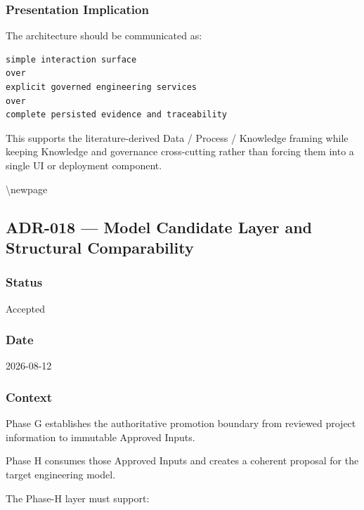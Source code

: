 \hypertarget{presentation-implication}{%
\subsubsection{Presentation Implication}\label{presentation-implication}}

The architecture should be communicated as:

\begin{verbatim}
simple interaction surface
over
explicit governed engineering services
over
complete persisted evidence and traceability
\end{verbatim}

This supports the literature-derived Data / Process / Knowledge framing while keeping Knowledge and governance cross-cutting rather than forcing them into a single UI or deployment component.

\textbackslash newpage

\hypertarget{adr-018--model-candidate-layer-and-structural-comparability}{%
\subsection{ADR-018 --- Model Candidate Layer and Structural Comparability}\label{adr-018--model-candidate-layer-and-structural-comparability}}

\hypertarget{status}{%
\subsubsection{Status}\label{status}}

Accepted

\hypertarget{date}{%
\subsubsection{Date}\label{date}}

2026-08-12

\hypertarget{context-3}{%
\subsubsection{Context}\label{context-3}}

Phase G establishes the authoritative promotion boundary from reviewed project information to immutable Approved Inputs.

Phase H consumes those Approved Inputs and creates a coherent proposal for the target engineering model.

The Phase-H layer must support:


